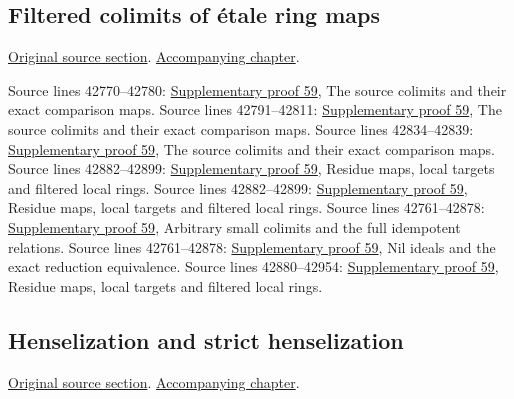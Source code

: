 \subsection{Filtered colimits of \'etale ring maps}
\hypertarget{algebra-source-section-ind-etale}{}
\noindent\href{https://github.com/stacks/stacks-project/blob/a04446e57ec1fbc252a871afcec7752fb2807b14/algebra.tex\#L42761}{Original source section}. \href{algebra.pdf\#nameddest=section-ind-etale}{Accompanying chapter}.

\begin{AlgebraSourceRoutes}
 Source lines 42770--42780: \hyperlink{algebra_indetale_notes_20260929}{Supplementary proof 59}, The source colimits and their exact comparison maps.
 Source lines 42791--42811: \hyperlink{algebra_indetale_notes_20260929}{Supplementary proof 59}, The source colimits and their exact comparison maps.
 Source lines 42834--42839: \hyperlink{algebra_indetale_notes_20260929}{Supplementary proof 59}, The source colimits and their exact comparison maps.
 Source lines 42882--42899: \hyperlink{algebra_indetale_notes_20260929}{Supplementary proof 59}, Residue maps, local targets and filtered local rings.
 Source lines 42882--42899: \hyperlink{algebra_indetale_notes_20260929}{Supplementary proof 59}, Residue maps, local targets and filtered local rings.
 Source lines 42761--42878: \hyperlink{algebra_indetale_notes_20260929}{Supplementary proof 59}, Arbitrary small colimits and the full idempotent relations.
 Source lines 42761--42878: \hyperlink{algebra_indetale_notes_20260929}{Supplementary proof 59}, Nil ideals and the exact reduction equivalence.
 Source lines 42880--42954: \hyperlink{algebra_indetale_notes_20260929}{Supplementary proof 59}, Residue maps, local targets and filtered local rings.
\end{AlgebraSourceRoutes}

\subsection{Henselization and strict henselization}
\hypertarget{algebra-source-section-henselization}{}
\noindent\href{https://github.com/stacks/stacks-project/blob/a04446e57ec1fbc252a871afcec7752fb2807b14/algebra.tex\#L42959}{Original source section}. \href{algebra.pdf\#nameddest=section-henselization}{Accompanying chapter}.

